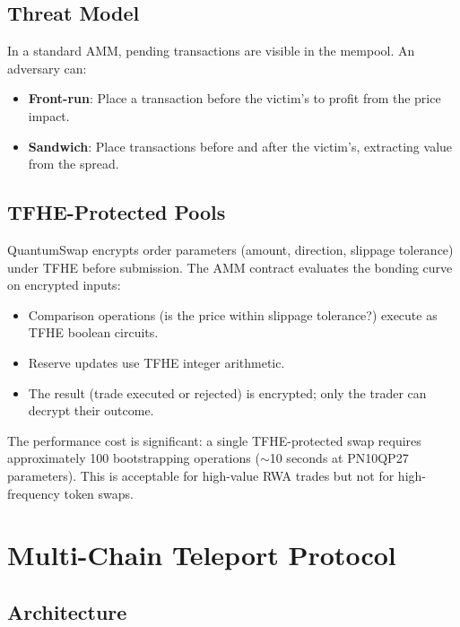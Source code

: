 \documentclass[11pt,a4paper]{article}
\begin{document}
\subsection{Threat Model}

In a standard AMM, pending transactions are visible in the mempool.
An adversary can:
\begin{itemize}[nosep]
  \item \textbf{Front-run}: Place a transaction before the victim's to
        profit from the price impact.
  \item \textbf{Sandwich}: Place transactions before and after the
        victim's, extracting value from the spread.
\end{itemize}

\subsection{TFHE-Protected Pools}

QuantumSwap encrypts order parameters (amount, direction, slippage
tolerance) under TFHE before submission. The AMM contract evaluates
the bonding curve on encrypted inputs:

\begin{itemize}[nosep]
  \item Comparison operations (is the price within slippage tolerance?)
        execute as TFHE boolean circuits.
  \item Reserve updates use TFHE integer arithmetic.
  \item The result (trade executed or rejected) is encrypted; only
        the trader can decrypt their outcome.
\end{itemize}

The performance cost is significant: a single TFHE-protected swap
requires approximately 100 bootstrapping operations ($\sim$10 seconds
at PN10QP27 parameters). This is acceptable for high-value RWA
trades but not for high-frequency token swaps.

\section{Multi-Chain Teleport Protocol}

\subsection{Architecture}
\end{document}
